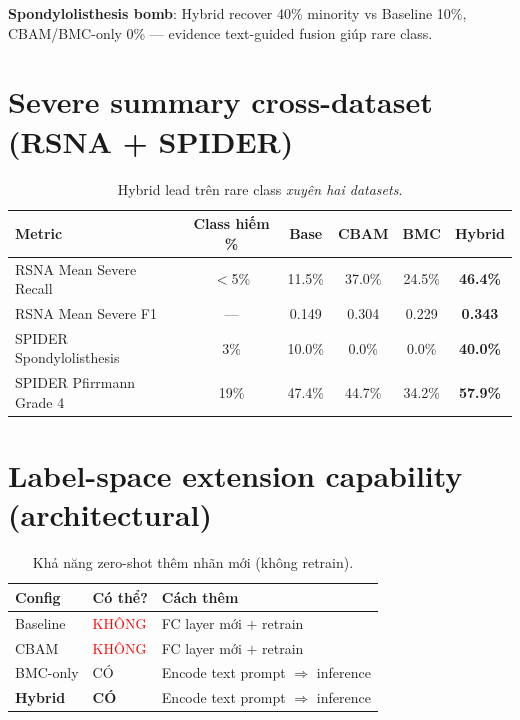 \documentclass[11pt,a4paper]{article}
\newcommand{\best}[1]{\textbf{#1}}
\begin{document}
\noindent\textbf{Spondylolisthesis bomb}: Hybrid recover 40\%
minority vs Baseline 10\%, CBAM/BMC-only 0\% --- evidence text-guided
fusion giúp rare class.

\section{Severe summary cross-dataset (RSNA + SPIDER)}

\begin{table}[h]
\centering
\caption{Hybrid lead trên rare class \emph{xuyên hai datasets}.}
\small
\begin{tabular}{@{}lccccc@{}}
\toprule
\rowcolor{tablehdr}
Metric & Class hiếm \% & Base & CBAM & BMC & \best{Hybrid} \\
\midrule
RSNA Mean Severe Recall   & $<$5\% & 11.5\% & 37.0\% & 24.5\% & \best{46.4\%} \\
RSNA Mean Severe F1       & ---   & 0.149  & 0.304  & 0.229  & \best{0.343} \\
SPIDER Spondylolisthesis  & 3\%   & 10.0\% & 0.0\%  & 0.0\%  & \best{40.0\%} \\
SPIDER Pfirrmann Grade 4  & 19\%  & 47.4\% & 44.7\% & 34.2\% & \best{57.9\%} \\
\bottomrule
\end{tabular}
\end{table}

\section{Label-space extension capability (architectural)}

\begin{table}[h]
\centering
\caption{Khả năng zero-shot thêm nhãn mới (không retrain).}
\small
\begin{tabular}{@{}lll@{}}
\toprule
\rowcolor{tablehdr}
Config & Có thể? & Cách thêm \\
\midrule
Baseline      & \textcolor{red}{KHÔNG} & FC layer mới $+$ retrain \\
CBAM          & \textcolor{red}{KHÔNG} & FC layer mới $+$ retrain \\
BMC-only      & \textcolor{green!60!black}{CÓ}  & Encode text prompt $\Rightarrow$ inference \\
\best{Hybrid} & \textcolor{green!60!black}{\best{CÓ}} & Encode text prompt $\Rightarrow$ inference \\
\bottomrule
\end{tabular}
\end{table}
\end{document}
